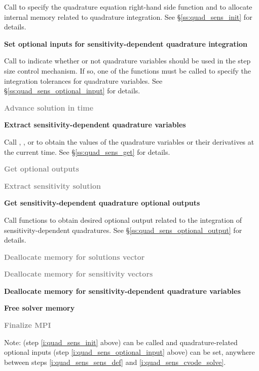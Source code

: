 \begin{Steps}
  Call  to specify the quadrature equation right-hand
  side function and to allocate internal memory related to quadrature integration. 
  See \S\ref{ss:quad_sens_init} for details.

\item\label{i:quad_sens_optional_input}
  {\bf Set optional inputs for sensitivity-dependent quadrature integration}

  Call  to indicate whether or not quadrature variables
  should be used in the step size control mechanism. If so, one of the 
   functions  must be called to specify the integration 
  tolerances for quadrature variables.
  See \S\ref{ss:quad_sens_optional_input} for details.

\item\label{i:quad_sens_cvode_solve}
  \textcolor{gray}{\bf Advance solution in time}

\item
  {\bf Extract sensitivity-dependent quadrature variables}

  Call , ,  or 
   to obtain the values of the quadrature variables or their 
  derivatives at the current time. See \S\ref{ss:quad_sens_get} for details.

\item
  \textcolor{gray}{\bf Get optional outputs}

\item
  \textcolor{gray}{\bf Extract sensitivity solution}

\item
  {\bf Get sensitivity-dependent quadrature optional outputs}

  Call  functions to obtain desired optional output related
  to the integration of sensitivity-dependent quadratures.
  See \S\ref{ss:quad_sens_optional_output} for details.

\item
  \textcolor{gray}{\bf Deallocate memory for solutions vector}

\item 
  \textcolor{gray}{\bf Deallocate memory for sensitivity vectors}

\item
  {\bf Deallocate memory for sensitivity-dependent quadrature variables}
  
\item
  {\bf Free solver memory}

\item 
  \textcolor{gray}{\bf {\p} Finalize MPI}
  
\end{Steps}
Note:  (step \ref{i:quad_sens_init} above) can
be called and quadrature-related optional inputs (step
\ref{i:quad_sens_optional_input} above) can be set, anywhere between
steps \ref{i:quad_sens_sens_def} and \ref{i:quad_sens_cvode_solve}.

